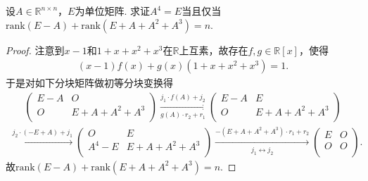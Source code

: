 \documentclass[../../main.tex]{subfiles}%
\begin{document}
\begin{example}
设$A \in \mathbb{R}^{n \times n}$，$E$为单位矩阵. 求证$A^4 = E$当且仅当$\text{rank}(E - A) + \text{rank}\left(E + A + A^2 + A^3\right) = n$.
\end{example}
\begin{proof}

注意到$x-1$和$1+x+x^2+x^3$在$\mathbb{R}$上互素，故存在$f,g\in \mathbb{R}[x]$，使得
\begin{align*}
(x-1)f(x) + g(x)(1+x+x^2+x^3) = 1.
\end{align*}
于是对如下分块矩阵做初等分块变换得
\begin{align*}
\left( \begin{matrix}
E-A&		O\\
O&		E+A+A^2+A^3\\
\end{matrix} \right) \xrightarrow[g(A) \cdot r_2+r_1]{j_1 \cdot f(A) +j_2}\left( \begin{matrix}
E-A&		E\\
O&		E+A+A^2+A^3\\
\end{matrix} \right) 
\end{align*}
\begin{align*}
\xrightarrow{j_2 \cdot (-E+A) +j_1}\left( \begin{matrix}
O&		E\\
A^4-E&		E+A+A^2+A^3\\
\end{matrix} \right) \xrightarrow[j_1 \longleftrightarrow j_2]{-(E+A+A^2+A^3) \cdot r_1+r_2}\left( \begin{matrix}
E&		O\\
O&		O\\
\end{matrix} \right).
\end{align*}
故$\text{rank}(E-A) + \text{rank}(E+A+A^2+A^3) = n.$

\end{proof}
\end{document}
